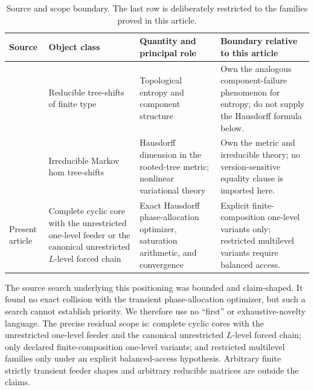 \begin{table}[t]
\centering
\small
\setlength{\tabcolsep}{3pt}
\caption{Source and scope boundary.  The last row is deliberately restricted
to the families proved in this article.}
\label{tab:scope}
\begin{tabular}{@{}P{0.20\textwidth}P{0.22\textwidth}P{0.25\textwidth}P{0.25\textwidth}@{}}
\toprule
Source & Object class & Quantity and principal role & Boundary relative to this article \\
\midrule
\citet{banEtAl2021,banEtAl2022}
& Reducible tree-shifts of finite type
& Topological entropy and component structure
& Own the analogous component-failure phenomenon for entropy; do not supply the Hausdorff formula below. \\
\addlinespace
\citet{banLaiWu2025}
& Irreducible Markov hom tree-shifts
& Hausdorff dimension in the rooted-tree metric; nonlinear variational theory
& Own the metric and irreducible theory; no version-sensitive equality clause is imported here. \\
\addlinespace
Present article
& Complete cyclic core with the unrestricted one-level feeder or the canonical unrestricted $L$-level forced chain
& Exact Hausdorff phase-allocation optimizer, saturation arithmetic, and convergence
& Explicit finite-composition one-level variants only; restricted multilevel variants require balanced access. \\
\bottomrule
\end{tabular}
\end{table}

The source search underlying this positioning was bounded and
claim-shaped.  It found no exact collision with the transient
phase-allocation optimizer, but such a search cannot establish priority.
We therefore use no ``first'' or exhaustive-novelty language.  The precise
residual scope is: complete cyclic cores with the unrestricted one-level
feeder and the canonical unrestricted $L$-level forced chain; only declared
finite-composition one-level variants; and restricted multilevel families
only under an explicit balanced-access hypothesis.  Arbitrary finite strictly
transient feeder shapes and arbitrary reducible matrices are outside the
claims.
